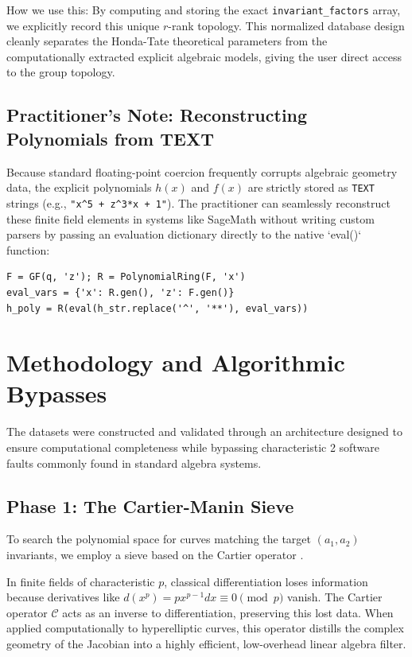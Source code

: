 \documentclass[letterpaper, 11pt]{article}
\begin{document}
How we use this: By computing and storing the exact \texttt{invariant\_factors} array, we explicitly record this unique $r$-rank topology. This normalized database design cleanly separates the Honda-Tate theoretical parameters from the computationally extracted explicit algebraic models, giving the user direct access to the group topology.

\subsection{Practitioner's Note: Reconstructing Polynomials from TEXT}
Because standard floating-point coercion frequently corrupts algebraic geometry data, the explicit polynomials $h(x)$ and $f(x)$ are strictly stored as \texttt{TEXT} strings (e.g., \texttt{"x\textasciicircum 5 + z\textasciicircum 3*x + 1"}). The practitioner can seamlessly reconstruct these finite field elements in systems like SageMath without writing custom parsers by passing an evaluation dictionary directly to the native `eval()` function:
\begin{verbatim}
F = GF(q, 'z'); R = PolynomialRing(F, 'x')
eval_vars = {'x': R.gen(), 'z': F.gen()}
h_poly = R(eval(h_str.replace('^', '**'), eval_vars))
\end{verbatim}

\section{Methodology and Algorithmic Bypasses}
The datasets were constructed and validated through an architecture designed to ensure computational completeness while bypassing characteristic 2 software faults commonly found in standard algebra systems.

\subsection{Phase 1: The Cartier-Manin Sieve}
To search the polynomial space for curves matching the target $(a_1, a_2)$ invariants, we employ a sieve based on the Cartier operator \cite{Cartier1958}. 

In finite fields of characteristic $p$, classical differentiation loses information because derivatives like $d(x^p) = px^{p-1} dx \equiv 0 \pmod p$ vanish. The Cartier operator $\mathcal{C}$ acts as an inverse to differentiation, preserving this lost data. When applied computationally to hyperelliptic curves, this operator distills the complex geometry of the Jacobian into a highly efficient, low-overhead linear algebra filter.
\end{document}
